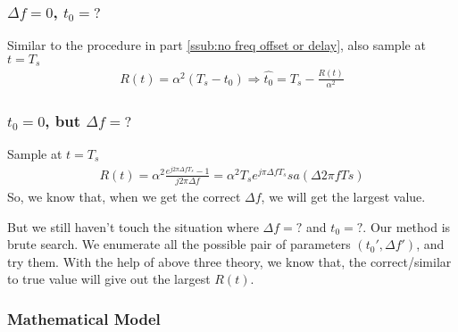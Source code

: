 \documentclass[journal]{IEEEtran}
\begin{document}
\subsubsection{$\Delta f = 0$, $t_0 = ?$} %
\label{ssub:no freq offset, but delay is unknown}
Similar to the procedure in part \ref{ssub:no freq offset or delay}, also sample at $t = T_s$
\begin{align}
	R(t) = \alpha^2(T_s-t_0) \Rightarrow \hat{t_0} = T_s - \frac{R(t)}{\alpha^2}
\end{align}

\subsubsection{$t_0 = 0$, but $\Delta f = ?$} %
\label{ssub:no delay, but freq offset is unknown}
Sample at $t = T_s$
\begin{align}
	R(t) = \alpha^2 \frac{e^{j 2\pi \Delta f T_s} - 1}{j 2\pi \Delta f} = \alpha^2 T_s e^{j \pi \Delta f T_s} sa(\Delta 2 \pi f Ts)
\end{align}
So, we know that, when we get the correct $\Delta f$, we will get the largest value. 

But we still haven't touch the situation where $\Delta f = ?$ and $t_0 = ?$. Our method is brute search.
We enumerate all the possible pair of parameters $(t_0', \Delta f')$, and try them. With the help of above three theory, we know that, the correct/similar to true value will give out the largest $R(t)$.

\subsubsection{Mathematical Model} %
\label{ssub:mathematical_model}







\end{document}
